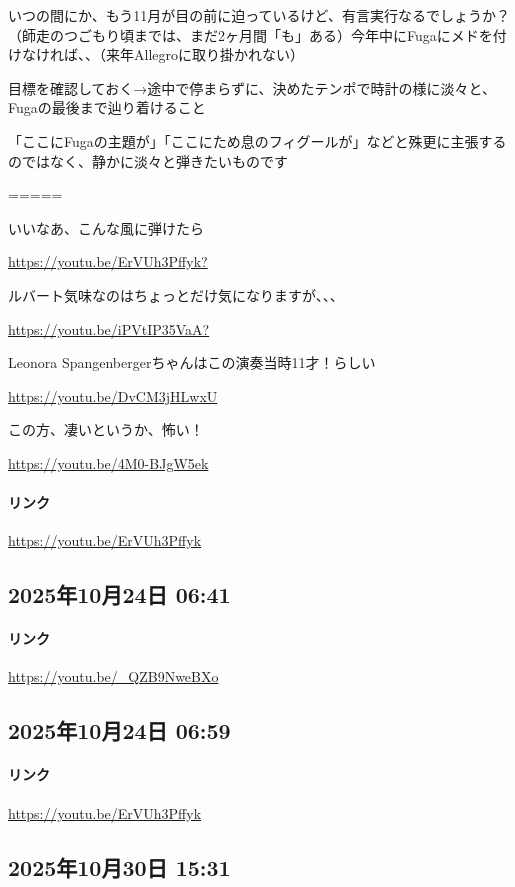 いつの間にか、もう11月が目の前に迫っているけど、有言実行なるでしょうか？（師走のつごもり頃までは、まだ2ヶ月間「も」ある）今年中にFugaにメドを付けなければ、、（来年Allegroに取り掛かれない）

目標を確認しておく→途中で停まらずに、決めたテンポで時計の様に淡々と、Fugaの最後まで辿り着けること

「ここにFugaの主題が」「ここにため息のフィグールが」などと殊更に主張するのではなく、静かに淡々と弾きたいものです

=====

いいなあ、こんな風に弾けたら

\url{https://youtu.be/ErVUh3Pffyk?}

ルバート気味なのはちょっとだけ気になりますが、、、

\url{https://youtu.be/iPVtIP35VaA?}

Leonora Spangenbergerちゃんはこの演奏当時11才！らしい

\url{https://youtu.be/DvCM3jHLwxU}

この方、凄いというか、怖い！

\url{https://youtu.be/4M0-BJgW5ek}

\paragraph{リンク}
\url{https://youtu.be/ErVUh3Pffyk}

\subsection*{2025年10月24日 06:41}

\paragraph{リンク}
\url{https://youtu.be/_QZB9NweBXo}

\subsection*{2025年10月24日 06:59}

\paragraph{リンク}
\url{https://youtu.be/ErVUh3Pffyk}

\subsection*{2025年10月30日 15:31}


